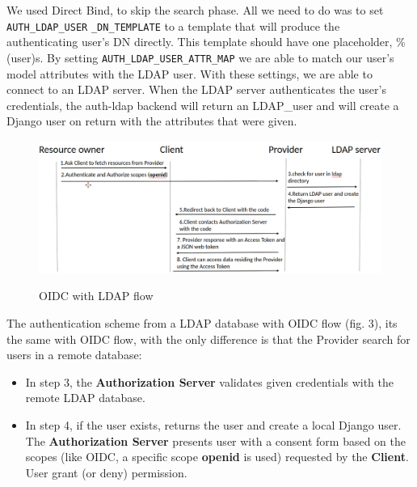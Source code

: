 We used Direct Bind, to skip the search phase. All we need to do was to set \verb|AUTH_LDAP_USER| \verb|_DN_TEMPLATE| to a template that will produce the authenticating user’s DN directly. This template should have one placeholder, \%(user)s. By setting \verb|AUTH_LDAP_USER_ATTR_MAP| we are able to match our user's model attributes with the LDAP user.
With these settings, we are able to connect to an LDAP server. When the LDAP server authenticates the user's credentials, the auth-ldap backend will return an LDAP\_user and will create a Django user on return with the attributes that were given.

\begin{figure}[htb]
	\centering
	\includegraphics[scale=0.3]{figures/LDAP.png}\\
	\caption{OIDC with LDAP flow}
\end{figure}

The authentication scheme from a LDAP database with OIDC flow (fig. 3), its the same with OIDC flow, with the only difference is that the Provider search for users in a remote database:

\begin{itemize}

	
	\item In step 3, the \textbf{Authorization Server }validates given credentials with the remote LDAP database. 
	
	\item In step 4, if the user exists, returns the user and create a local Django user. The \textbf{Authorization Server} presents user with a consent form based on the scopes (like OIDC, a specific scope \textbf{openid} is used) requested by the \textbf{Client}. User grant (or deny) permission.
	
	
\end{itemize}

